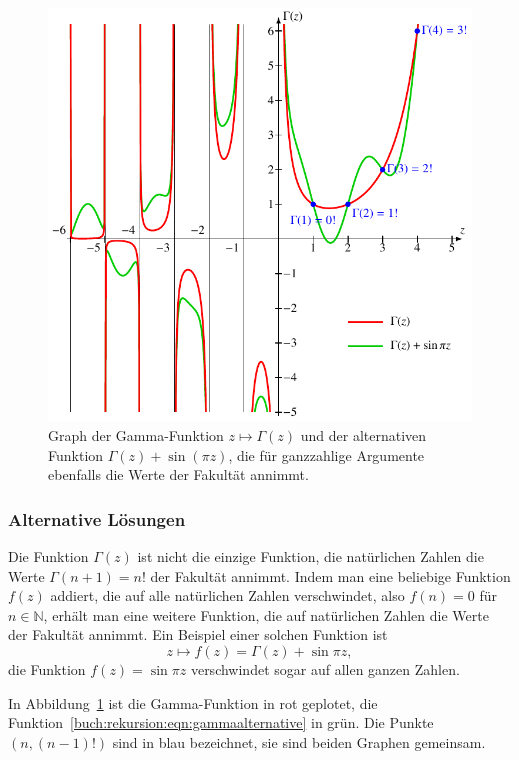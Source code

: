 \begin{figure}
\centering
\includegraphics{chapters/040-rekursion/images/gammaplot.pdf}
\caption{Graph der Gamma-Funktion $z\mapsto\Gamma(z)$ und der alternativen
Funktion $\Gamma(z)+\sin(\pi z)$, die für ganzzahlige Argumente ebenfalls
die Werte der Fakultät annimmt.
\label{buch:rekursion:fig:gamma}}
\end{figure}

\subsubsection{Alternative Lösungen}
Die Funktion $\Gamma(z)$ ist nicht die einzige Funktion, die natürlichen
Zahlen die Werte $\Gamma(n+1) = n!$ der Fakultät annimmt.
Indem man eine beliebige Funktion $f(z)$ addiert, die auf alle
natürlichen Zahlen verschwindet, also $f(n)=0$ für $n\in\mathbb{N}$,
erhält man eine weitere Funktion, die auf natürlichen Zahlen
die Werte der Fakultät annimmt.
Ein Beispiel einer solchen Funktion ist
\begin{equation}
z\mapsto f(z)=\Gamma(z) + \sin \pi z,
\label{buch:rekursion:eqn:gammaalternative}
\end{equation}
die Funktion $f(z)=\sin\pi z$ verschwindet sogar auf allen ganzen
Zahlen.

In Abbildung~\ref{buch:rekursion:fig:gamma} ist die Gamma-Funktion
in rot geplotet, die Funktion~\eqref{buch:rekursion:eqn:gammaalternative}
in grün.
Die Punkte $(n,(n-1)!)$ sind in blau bezeichnet, sie sind beiden Graphen
gemeinsam.


